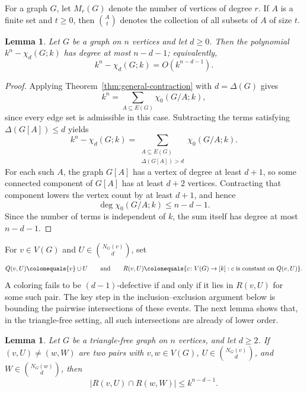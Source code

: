 \documentclass[12pt,reqno]{amsart}
\newtheorem{lem}[thm]{Lemma}
\theoremstyle{definition}
\begin{document}
For a graph $G$, let $M_r(G)$ denote the number of vertices of degree $r$. If $A$ is a finite set and $t\geq 0$, then $\binom{A}{t}$ denotes the collection of all subsets of $A$ of size $t$.

\begin{lem}\label{lem:degree-bound}
Let $G$ be a graph on $n$ vertices and let $d\geq 0$. Then the polynomial $k^n-\chi_d(G;k)$ has degree at most $n-d-1$; equivalently,
\[
k^n-\chi_d(G;k)=O(k^{n-d-1}).
\]
\end{lem}

\begin{proof}
Applying Theorem~\ref{thm:general-contraction} with $d=\Delta(G)$ gives
\[
k^n=\sum_{A\subseteq E(G)} \chi_0(G/A;k),
\]
since every edge set is admissible in this case. Subtracting the terms satisfying $\Delta(G[A])\leq d$ yields
\[
k^n-\chi_d(G;k)
=
\sum_{\substack{A\subseteq E(G)\\ \Delta(G[A])>d}} \chi_0(G/A;k).
\]
For each such $A$, the graph $G[A]$ has a vertex of degree at least $d+1$, so some connected component of $G[A]$ has at least $d+2$ vertices. Contracting that component lowers the vertex count by at least $d+1$, and hence
\[
\deg \chi_0(G/A;k)\leq n-d-1.
\]
Since the number of terms is independent of $k$, the sum itself has degree at most $n-d-1$.
\end{proof}

For $v\in V(G)$ and $U\in \binom{N_G(v)}{d}$, set
\[
Q(v,U)\colonequals \{v\}\cup U
\qquad\text{and}\qquad
R(v,U)\colonequals \{c\colon V(G)\to [k] : c \text{ is constant on } Q(v,U)\}.
\]
A coloring fails to be $(d-1)$-defective if and only if it lies in $R(v,U)$ for some such pair. The key step in the inclusion--exclusion argument below is bounding the pairwise intersections of these events. The next lemma shows that, in the triangle-free setting, all such intersections are already of lower order.

\begin{lem}\label{lem:pairwise-intersections}
Let $G$ be a triangle-free graph on $n$ vertices, and let $d\geq 2$. If $(v,U)\neq (w,W)$ are two pairs with $v,w\in V(G)$, $U\in \binom{N_G(v)}{d}$, and $W\in \binom{N_G(w)}{d}$, then
\[
|R(v,U)\cap R(w,W)|\leq k^{n-d-1}.
\]
\end{lem}
\end{document}
